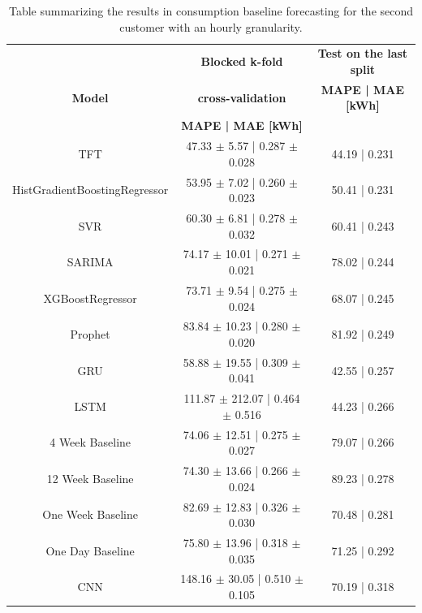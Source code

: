 \begin{table}[H]
\centering
\begin{tabular}{|c|c|c|}
\hline
 & \textbf{Blocked k-fold} & \textbf{Test on the last split}\\
\textbf{Model} & \textbf{cross-validation} & \textbf{MAPE | MAE [kWh]}\\
 & \textbf{MAPE | MAE [kWh]} & \\
\hline
TFT & 47.33 $\pm$ 5.57 | 0.287 $\pm$ 0.028 & 44.19 | 0.231\\
\hline
HistGradientBoostingRegressor & 53.95 $\pm$ 7.02 | 0.260 $\pm$ 0.023 & 50.41 | 0.231\\
\hline
SVR & 60.30 $\pm$ 6.81 | 0.278 $\pm$ 0.032 & 60.41 | 0.243\\
\hline
SARIMA & 74.17 $\pm$ 10.01 | 0.271 $\pm$ 0.021 & 78.02 | 0.244\\
\hline
XGBoostRegressor & 73.71 $\pm$ 9.54 | 0.275 $\pm$ 0.024 & 68.07 | 0.245\\
\hline
Prophet & 83.84 $\pm$ 10.23 | 0.280 $\pm$ 0.020 & 81.92 | 0.249\\
\hline
GRU & 58.88 $\pm$ 19.55 | 0.309 $\pm$ 0.041 & 42.55 | 0.257\\
\hline
LSTM & 111.87 $\pm$ 212.07 | 0.464 $\pm$ 0.516 & 44.23 | 0.266\\
\hline
4 Week Baseline & 74.06 $\pm$ 12.51 | 0.275 $\pm$ 0.027 & 79.07 | 0.266\\
\hline
12 Week Baseline & 74.30 $\pm$ 13.66 | 0.266 $\pm$ 0.024 & 89.23 | 0.278\\
\hline
One Week Baseline & 82.69 $\pm$ 12.83 | 0.326 $\pm$ 0.030 & 70.48 | 0.281\\
\hline
One Day Baseline & 75.80 $\pm$ 13.96 | 0.318 $\pm$ 0.035 & 71.25 | 0.292\\
\hline
CNN & 148.16 $\pm$ 30.05 | 0.510 $\pm$ 0.105 & 70.19 | 0.318\\
\hline
\end{tabular}
\caption{Table summarizing the results in consumption baseline forecasting for the second customer with an hourly granularity.}
\label{tab:baselinehourlyresults}
\end{table}

